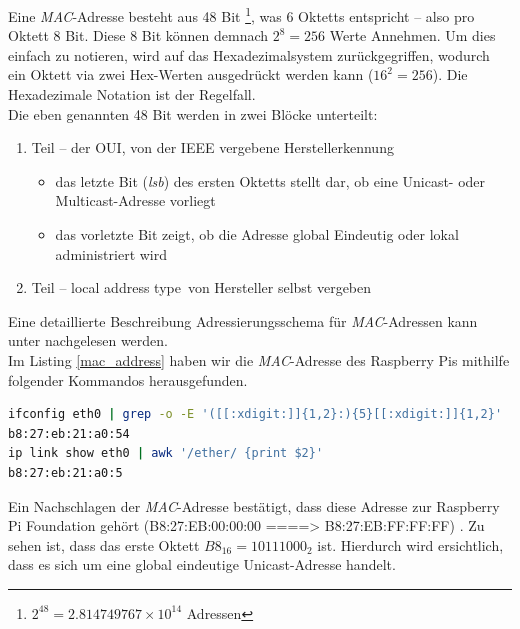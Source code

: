 \documentclass[paper=a4,fontsize=11pt]{scrartcl}%
\numberwithin{equation}{section}
\begin{document}
Eine \emph{MAC}-Adresse besteht aus 48 Bit \footnote{$2^{48} = 2.814749767×10^{14}$ Adressen}, was 6 Oktetts entspricht -- also pro Oktett 8 Bit. Diese 8 Bit können demnach $2^8 = 256$ Werte Annehmen. Um dies einfach zu notieren, wird auf das Hexadezimalsystem zurückgegriffen, wodurch ein Oktett via zwei Hex-Werten ausgedrückt werden kann ($16^2=256$). Die Hexadezimale Notation ist der Regelfall.\\
Die eben genannten 48 Bit werden in zwei Blöcke unterteilt: 
\begin{enumerate}
	\item Teil -- der \ac{OUI}, von der IEEE vergebene Herstellerkennung
	\begin{itemize}
		\item das letzte Bit (\emph{lsb}) des ersten Oktetts stellt dar, ob eine Unicast- oder Multicast-Adresse vorliegt
		\item das vorletzte Bit zeigt, ob die Adresse global Eindeutig oder lokal administriert wird
	\end{itemize}
	\item Teil -- \glqq local address type\grqq\ von Hersteller selbst vergeben
\end{enumerate}
Eine detaillierte Beschreibung Adressierungsschema für \emph{MAC}-Adressen kann unter \cite[S. 19ff]{802-2001} nachgelesen werden.\\

Im Listing \ref{mac_address} haben wir die \emph{MAC}-Adresse des Raspberry Pis mithilfe folgender Kommandos herausgefunden.
\begin{lstlisting}[style=Bash, language=Bash, label=mac_address]
ifconfig eth0 | grep -o -E '([[:xdigit:]]{1,2}:){5}[[:xdigit:]]{1,2}'
b8:27:eb:21:a0:54
ip link show eth0 | awk '/ether/ {print $2}'
b8:27:eb:21:a0:5
\end{lstlisting}
Ein Nachschlagen der \emph{MAC}-Adresse bestätigt, dass diese Adresse zur Raspberry Pi Foundation gehört (B8:27:EB:00:00:00 ====> B8:27:EB:FF:FF:FF) \cite{mac_vendor}. Zu sehen ist, dass das erste Oktett $B8_{16} = 10111000_2$ ist. Hierdurch wird ersichtlich, dass es sich um eine global eindeutige Unicast-Adresse handelt.
\end{document}
